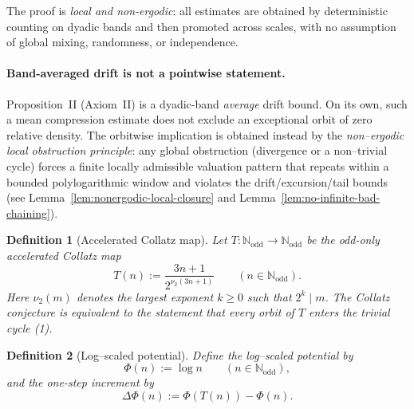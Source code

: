 \documentclass[preprint,12pt]{elsarticle}
\newtheorem{definition}{Definition}
\begin{document}
The proof is \emph{local and non-ergodic}: all estimates are obtained by deterministic counting on dyadic bands and then promoted across scales, with no assumption of global mixing, randomness, or independence.

\paragraph{\textbf{Band-averaged drift is not a pointwise statement}.}
Proposition~II (Axiom~II) is a dyadic-band \emph{average} drift bound.
On its own, such a mean compression estimate does not exclude an exceptional orbit of zero relative density.
The orbitwise implication is obtained instead by the \emph{non--ergodic local obstruction principle}:
any global obstruction (divergence or a non--trivial cycle) forces a finite locally admissible valuation pattern
that repeats within a bounded polylogarithmic window and violates the drift/excursion/tail bounds
(see Lemma~\ref{lem:nonergodic-local-closure} and Lemma~\ref{lem:no-infinite-bad-chaining}).


\begin{definition}[Accelerated Collatz map]
Let $T:\mathbb{N}_{\mathrm{odd}}\to\mathbb{N}_{\mathrm{odd}}$ be the odd-only accelerated Collatz map
\[
T(n) := \frac{3n+1}{2^{\nu_2(3n+1)}}\qquad (n\in\mathbb{N}_{\mathrm{odd}}).
\]
Here $\nu_2(m)$ denotes the largest exponent $k\ge 0$ such that $2^k\mid m$.
The Collatz conjecture is equivalent to the statement that every orbit of \(T\) enters the trivial cycle (1).
\end{definition}

\begin{definition}[Log--scaled potential]
Define the log--scaled potential by
\[
\Phi(n):=\log n\qquad (n\in\mathbb{N}_{\mathrm{odd}}),
\]
and the one-step increment by
\[
\Delta\Phi(n):=\Phi(T(n))-\Phi(n).
\]
\end{definition}
\end{document}
